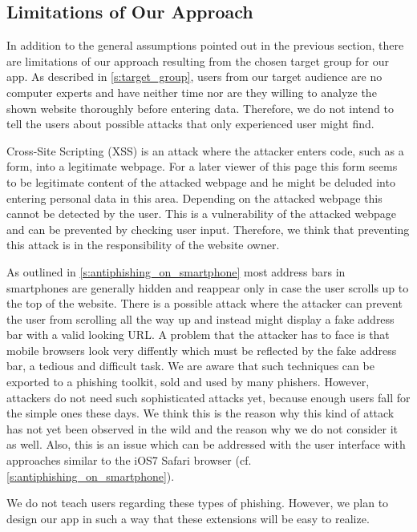 \subsection{Limitations of Our Approach}
In addition to the general assumptions pointed out in the previous section, there are limitations of our approach resulting from the chosen target group for our app.
As described in \autoref{s:target_group}, users from our target audience are no computer experts and have neither time nor are they willing to analyze the shown website thoroughly before entering data.
Therefore, we do not intend to tell the users about possible attacks that only experienced user might find.
\begin{description}[leftmargin=0cm]
	\item[Cross-Site Scripting]
	Cross-Site Scripting (XSS) is an attack where the attacker enters code, such as a form, into a legitimate webpage.
	For a later viewer of this page this form seems to be legitimate content of the attacked webpage and he might be deluded into entering personal data in this area. 
	Depending on the attacked webpage this cannot be detected by the user.
	This is a vulnerability of the attacked webpage and can be prevented by checking user input.
	Therefore, we think that preventing this attack is in the responsibility of the website owner.
	\item[URL Hiding Techniques]
	As outlined in \autoref{s:antiphishing_on_smartphone} most address bars in smartphones are generally hidden and reappear only in case the user scrolls up to the top of the website.
	There is a possible attack where the attacker can prevent the user from scrolling all the way up and instead might display a fake address bar with a valid looking URL.
	A problem that the attacker has to face is that mobile browsers look very diffently which must be reflected by the fake address bar, a tedious and difficult task.
	We are aware that such techniques can be exported to a phishing toolkit, sold and used by many phishers. However, attackers do not need such sophisticated attacks yet, because enough users fall for the simple ones these days. 
	We think this is the reason why this kind of attack has not yet been observed in the wild and the reason why we do not consider it as well.
Also, this is an issue which can be addressed with the user interface with approaches similar to the iOS7 Safari browser (cf. \autoref{s:antiphishing_on_smartphone}).
\end{description}
We do not teach users regarding these types of phishing. However, we plan to design our app in such a way that these extensions will be easy to realize.